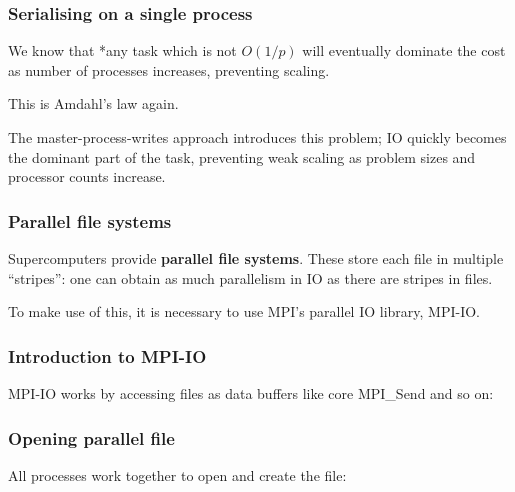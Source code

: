 \subsubsection{Serialising on a single
process}\label{serialising-on-a-single-process}

We know that *any task which is not $O(1/p)$ will eventually dominate
the cost as number of processes increases, preventing scaling.

This is Amdahl's law again.

The master-process-writes approach introduces this problem; IO quickly
becomes the dominant part of the task, preventing weak scaling as
problem sizes and processor counts increase.

\subsubsection{Parallel file systems}\label{parallel-file-systems}

Supercomputers provide \textbf{parallel file systems}. These store each
file in multiple ``stripes'': one can obtain as much parallelism in IO
as there are stripes in files.

To make use of this, it is necessary to use MPI's parallel IO library,
MPI-IO.

\subsubsection{Introduction to MPI-IO}\label{introduction-to-mpi-io}

MPI-IO works by accessing files as data buffers like core MPI\_Send and
so on:

\begin{Shaded}
\begin{Highlighting}[]

\end{Highlighting}
\end{Shaded}

\subsubsection{Opening parallel file}\label{opening-parallel-file}

All processes work together to open and create the file:

\begin{Shaded}
\begin{Highlighting}[]

     \NormalTok{<} 
\end{Highlighting}
\end{Shaded}

